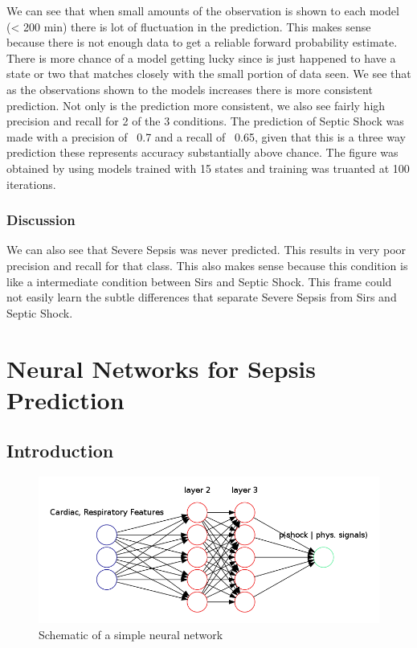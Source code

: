 \documentclass[12pt,solutions]{article}
\begin{document}
We can see that when small amounts of the observation is shown to each model (< 200 min) there is lot of fluctuation in the prediction. This makes sense because there is not enough data to get a reliable forward probability estimate. There is more chance of a model getting lucky since is just happened to have a state or two that matches closely with the small portion of data seen. We see that as the observations shown to the models increases there is more consistent prediction. Not only is the prediction more consistent, we also see fairly high precision and recall for 2 of the 3 conditions. The prediction of Septic Shock was made with a precision of ~0.7 and a recall of ~0.65, given that this is a three way prediction these represents accuracy substantially above chance. The figure was obtained by using models trained with 15 states and training was truanted at 100 iterations.\\

\subsubsection{Discussion}
We can also see that Severe Sepsis was never predicted. This results in very poor precision and recall for that class. This also makes sense because this condition is like a intermediate condition between Sirs and Septic Shock. This frame could not easily learn the subtle differences that separate Severe Sepsis from Sirs and Septic Shock.




\section{Neural Networks for Sepsis Prediction}

\subsection{Introduction}

\begin{figure}[h!]
  \caption{Schematic of a simple neural network}
  \centering
    \includegraphics[width=1.0\textwidth]{nn_plots/nn}
\end{figure}
\end{document}
